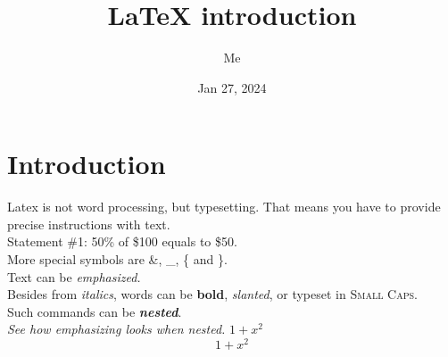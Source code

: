 \documentclass[a4paper, 12pt]{article}
\title{\LaTeX \: introduction}
\author{Me}
\date{Jan 27, 2024}
\begin{document}
\maketitle
\newpage
\tableofcontents
\newpage
\section{Introduction}
Latex is not word processing, but typesetting. That means you have to provide precise instructions with text.\\
Statement \#1:
50\% of \$100 equals to \$50.\\
More special symbols are \&, \_, \{ and \}.\\
Text can be \emph{emphasized.}\\
Besides from \textit{italics}, words can be \textbf{bold}, \textsl{slanted}, or typeset in \textsc{Small Caps}.\\
Such commands can be \textit{\textbf{nested}}.\\
\emph{See how \emph{emphasizing} looks when nested.} \(1+x^2\) \[1+x^2\] %
\end{document}

